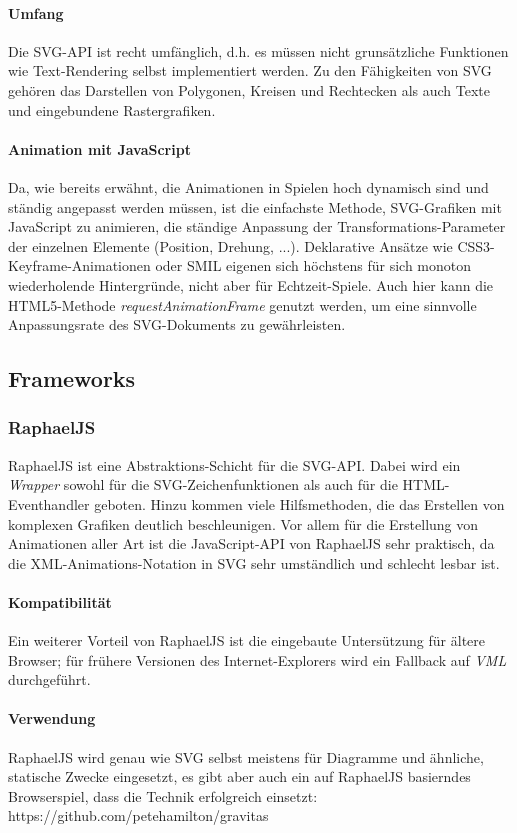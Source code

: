 \documentclass[a4paper, 12pt]{article}
\begin{document}
\paragraph{Umfang} Die SVG-API ist recht umfänglich, d.h. es müssen nicht grunsätzliche Funktionen wie Text-Rendering selbst implementiert werden. Zu den Fähigkeiten von SVG gehören das Darstellen von Polygonen, Kreisen und Rechtecken als auch Texte und eingebundene Rastergrafiken.
\paragraph{Animation mit JavaScript} Da, wie bereits erwähnt, die Animationen in Spielen hoch dynamisch sind und ständig angepasst werden müssen, ist die einfachste Methode, SVG-Grafiken mit JavaScript zu animieren, die ständige Anpassung der Transformations-Parameter der einzelnen Elemente (Position, Drehung, ...). Deklarative Ansätze wie CSS3-Keyframe-Animationen oder SMIL eigenen sich höchstens für sich monoton wiederholende Hintergründe, nicht aber für Echtzeit-Spiele. Auch hier kann die HTML5-Methode \emph{requestAnimationFrame} genutzt werden, um eine sinnvolle Anpassungsrate des SVG-Dokuments zu gewährleisten.
\subsection{Frameworks}
\subsubsection{RaphaelJS}
RaphaelJS ist eine Abstraktions-Schicht für die SVG-API. Dabei wird ein \emph{Wrapper} sowohl für die SVG-Zeichenfunktionen als auch für die HTML-Eventhandler geboten. Hinzu kommen viele Hilfsmethoden, die das Erstellen von komplexen Grafiken deutlich beschleunigen. Vor allem für die Erstellung von Animationen aller Art ist die JavaScript-API von RaphaelJS sehr praktisch, da die XML-Animations-Notation in SVG sehr umständlich und schlecht lesbar ist.
\paragraph{Kompatibilität} Ein weiterer Vorteil von RaphaelJS ist die eingebaute Untersützung für ältere Browser; für frühere Versionen des Internet-Explorers wird ein Fallback auf \emph{VML} durchgeführt.
\paragraph{Verwendung} RaphaelJS wird genau wie SVG selbst meistens für Diagramme und ähnliche, statische Zwecke eingesetzt, es gibt aber auch ein auf RaphaelJS basierndes Browserspiel, dass die Technik erfolgreich einsetzt: https://github.com/petehamilton/gravitas
\end{document}
